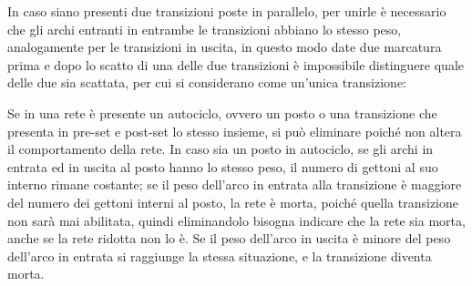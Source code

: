 \documentclass{article}
\numberwithin{equation}{subsection}
\begin{document}
In caso siano presenti due transizioni poste in parallelo, per unirle è necessario che gli archi entranti in entrambe le transizioni abbiano lo stesso peso, analogamente per 
le transizioni in uscita, in questo modo date due marcatura prima e dopo lo scatto di una delle due transizioni è impossibile distinguere quale delle due sia scattata, per cui 
si considerano come un'unica transizione:
\begin{center}
\end{center}

Se in una rete è presente un autociclo, ovvero un posto o una transizione che presenta in pre-set e post-set lo stesso insieme, si può eliminare poiché non altera il 
comportamento della rete. 
In caso sia un posto in autociclo, se gli archi in entrata ed in uscita al posto hanno lo stesso peso, il numero di gettoni al suo interno rimane costante; se il peso dell'arco 
in entrata alla transizione è maggiore del numero dei gettoni interni al posto, la rete è morta, poiché quella transizione non sarà mai abilitata, quindi eliminandolo bisogna 
indicare che la rete sia morta, anche se la rete ridotta non lo è. Se il peso dell'arco in uscita è minore del peso dell'arco in entrata si raggiunge la stessa situazione, e 
la transizione diventa morta. 
\begin{center}
\end{center} 
\end{document}
